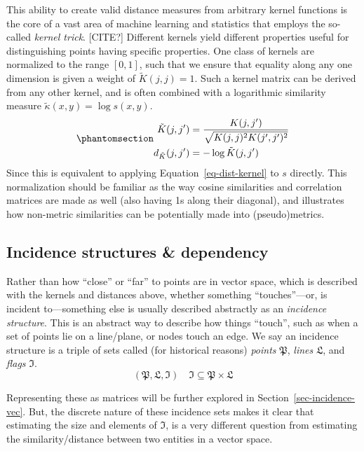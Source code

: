 \documentclass[%
	12pt,
		oneside,
		letterpaper
]{book}
\begin{document}
This ability to create valid distance measures from arbitrary kernel
functions is the core of a vast area of machine learning and statistics
that employs the so-called \emph{kernel trick}. {[}CITE?{]} Different
kernels yield different properties useful for distinguishing points
having specific properties. One class of kernels are normalized to the
range \([0,1]\), such that we ensure that equality along any one
dimension is given a weight of \(\tilde{K}(j,j)=1\). Such a kernel
matrix can be derived from any other kernel, and is often combined with
a logarithmic similarity measure \(\tilde{\kappa}(x,y)=\log{s(x,y)}\).
\begin{equation}\phantomsection\label{eq-norm-diag}{
\begin{aligned}
\tilde{K}(j,j') &= \frac{K(j,j')}{\sqrt{K(j,j)^2K(j',j')^2}}\\
d_{\tilde{K}}(j,j') &= -\log{\tilde{K}(j,j')}
\end{aligned}
}\end{equation} Since this is equivalent to applying
Equation~\ref{eq-dist-kernel} to \(s\) directly. This normalization
should be familiar as the way cosine similarities and correlation
matrices are made as well (also having 1s along their diagonal), and
illustrates how non-metric similarities can be potentially made into
(pseudo)metrics.

\subsection{Incidence structures \&
dependency}\label{incidence-structures-dependency}

Rather than how ``close'' or ``far'' to points are in vector space,
which is described with the kernels and distances above, whether
something ``touches''---or, is incident to---something else is usually
described abstractly as an \emph{incidence structure}. This is an
abstract way to describe how things ``touch'', such as when a set of
points lie on a line/plane, or nodes touch an edge. We say an incidence
structure is a triple of sets called (for historical reasons)
\emph{points} \(\mathfrak{P}\), \emph{lines} \(\mathfrak{L}\), and
\emph{flags} \(\mathfrak{I}\).\autocite{Incidencegeometry_Moorhouse2007}
\[(\mathfrak{P,L,I})\quad \mathfrak{I}\subseteq \mathfrak{P}\times\mathfrak{L}\]

Representing these as matrices will be further explored in
Section~\ref{sec-incidence-vec}. But, the discrete nature of these
incidence sets makes it clear that estimating the size and elements of
\(\mathfrak{I}\), is a very different question from estimating the
similarity/distance between two entities in a vector space.
\end{document}
